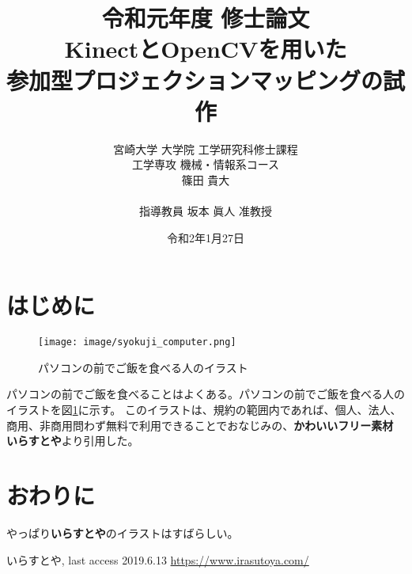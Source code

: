 \documentclass[uplatex, onecolumn,12pt]{jsbook}
\title{
{\Large 令和元年度 修士論文} \\[4cm]
\LARGE KinectとOpenCVを用いた
     \\参加型プロジェクションマッピングの試作 \\[4cm]
}
\author{宮崎大学 大学院 工学研究科修士課程\\
工学専攻 機械・情報系コース\\
篠田 貴大\\
\\
指導教員 坂本 眞人 准教授
}
\date{令和2年1月27日}
\begin{document}
\maketitle

\clearpage


\section{はじめに}
\begin{figure}[t]
    \begin{center}
        \texttt{[image: image/syokuji\_computer.png]}
        \caption{パソコンの前でご飯を食べる人のイラスト}
        \label{fig:syokuji_computer}
    \end{center}
\end{figure}

パソコンの前でご飯を食べることはよくある。パソコンの前でご飯を食べる人のイラストを図\ref{fig:syokuji_computer}に示す。
このイラストは、規約の範囲内であれば、個人、法人、商用、非商用問わず無料で利用できることでおなじみの、{\bf かわいいフリー素材 いらすとや}\cite{irasutoya}より引用した。

\section{おわりに}
やっぱり{\bf いらすとや}のイラストはすばらしい。

\begin{thebibliography}{99}
     いらすとや, last access 2019.6.13 \url{https://www.irasutoya.com/}



\end{thebibliography}
\end{document}
